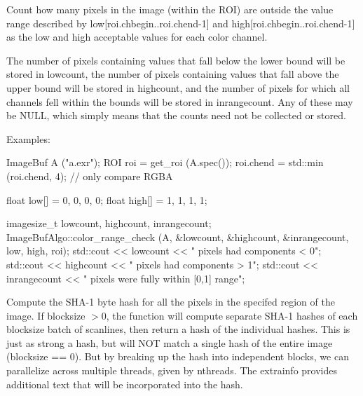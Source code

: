  

Count how many pixels in the image (within the ROI) are outside the
value range described by {\cf low[roi.chbegin..roi.chend-1]} and
{\cf high[roi.chbegin..roi.chend-1]} 
as the low and high acceptable values for each color channel.  

The number of pixels containing values that fall below the lower bound
will be stored in {\cf *lowcount}, the number of pixels containing
values that fall above the upper bound will be stored in 
{\cf *highcount}, and the number of pixels for which all channels fell
within the bounds will be stored in {\cf *inrangecount}.  Any of these
may be NULL, which simply means that the counts need not be collected or
stored.

\smallskip
\noindent Examples:
\begin{code}
    ImageBuf A ("a.exr");
    ROI roi = get_roi (A.spec());
    roi.chend = std::min (roi.chend, 4);  // only compare RGBA

    float low[] = {0, 0, 0, 0};
    float high[] = {1, 1, 1, 1};

    imagesize_t lowcount, highcount, inrangecount;
    ImageBufAlgo::color_range_check (A, &lowcount, &highcount, &inrangecount,
                                     low, high, roi);
    std::cout << lowcount << " pixels had components < 0\n";
    std::cout << highcount << " pixels had components > 1\n";
    std::cout << inrangecount << " pixels were fully within [0,1] range\n";
\end{code}
\apiend


 

Compute the SHA-1 byte hash for all the pixels in the specifed region of
the image.  If {\cf blocksize} $> 0$, the function will compute separate
SHA-1 hashes of each {\cf blocksize} batch of scanlines, then return a
hash of the individual hashes.  This is just as strong a hash, but will
NOT match a single hash of the entire image ({\cf blocksize == 0}).  But
by breaking up the hash into independent blocks, we can parallelize
across multiple threads, given by {\cf nthreads}.
The {\cf extrainfo} provides additional text that will be
incorporated into the hash.

